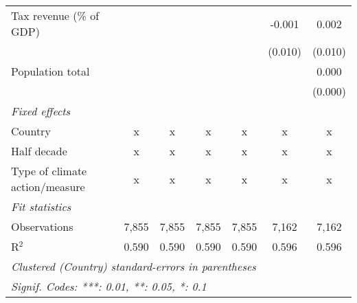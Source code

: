 \begin{tabular}{lcccccc}
   Tax revenue (\% of GDP)                      &         &              &              &              & -0.001        & 0.002\\   
                                                &         &              &              &              & (0.010)       & (0.010)\\   
   Population total                             &         &              &              &              &               & 0.000\\   
                                                &         &              &              &              &               & (0.000)\\   
   \emph{Fixed effects}\\
   Country                                      & x       & x            & x            & x            & x             & x\\  
   Half decade                                  & x       & x            & x            & x            & x             & x\\  
   Type of climate action/measure               & x       & x            & x            & x            & x             & x\\  
   \midrule \emph{Fit statistics}\\
   Observations                                 & 7,855   & 7,855        & 7,855        & 7,855        & 7,162         & 7,162\\  
   R$^2$                                        & 0.590   & 0.590        & 0.590        & 0.590        & 0.596         & 0.596\\  
   \midrule
   \multicolumn{7}{l}{\emph{Clustered (Country) standard-errors in parentheses}}\\
   \multicolumn{7}{l}{\emph{Signif. Codes: ***: 0.01, **: 0.05, *: 0.1}}\\
\end{tabular}
\par\endgroup


